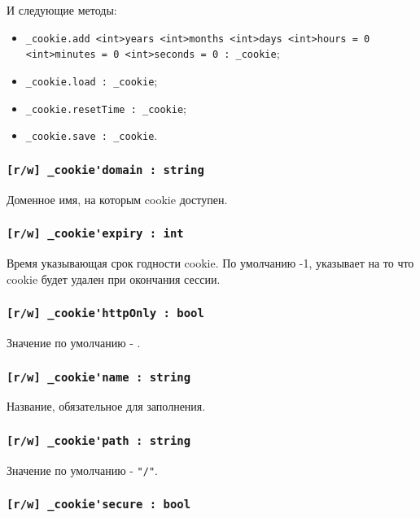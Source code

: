 \documentclass[a4paper, 14pt]{extarticle}
\newenvironment{icItems}
	{ \begin{itemize} [noitemsep,nolistsep] }
	{ \end{itemize} }
\begin{document}
И следующие методы:
\begin{icItems}
	\item \lstinline|_cookie.add <int>years <int>months <int>days <int>hours = 0 <int>minutes = 0 <int>seconds = 0 : _cookie|;
	\item \lstinline|_cookie.load : _cookie|;
	\item \lstinline|_cookie.resetTime : _cookie|;
	\item \lstinline|_cookie.save : _cookie|.
\end{icItems}

\subsubsection{\lstinline|[r/w] _cookie'domain : string|}

Доменное имя, на которым cookie доступен.

\subsubsection{\lstinline|[r/w] _cookie'expiry : int|}

Время указывающая срок годности cookie. По умолчанию -1, указывает на то что cookie будет удален при окончания сессии.

\subsubsection{\lstinline|[r/w] _cookie'httpOnly : bool|}

Значение по умолчанию - \false.

\subsubsection{\lstinline|[r/w] _cookie'name : string|}

Название, обязательное для заполнения.

\subsubsection{\lstinline|[r/w] _cookie'path : string|}

Значение по умолчанию - \lstinline|"/"|.

\subsubsection{\lstinline|[r/w] _cookie'secure : bool|}
\end{document}
